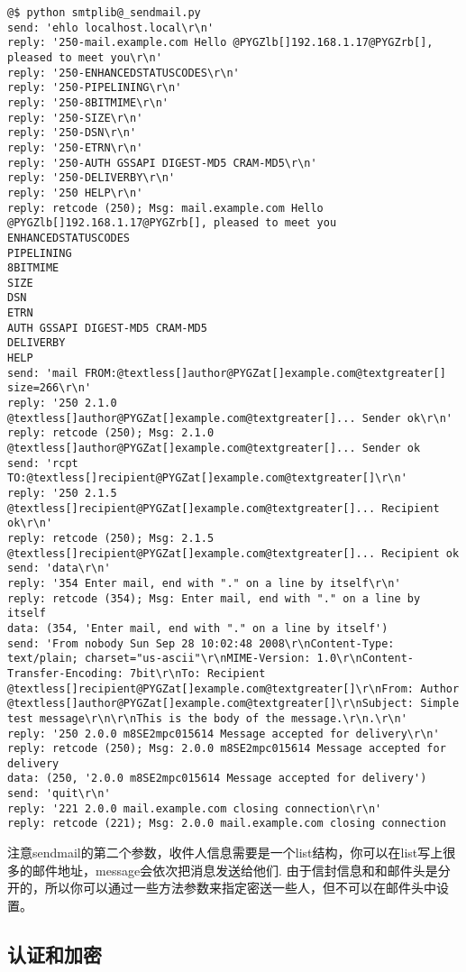 \documentclass[letterpaper,10pt,english]{manual}
\begin{document}
\begin{Verbatim}[commandchars=@\[\]]
@$ python smtplib@_sendmail.py
send: 'ehlo localhost.local\r\n'
reply: '250-mail.example.com Hello @PYGZlb[]192.168.1.17@PYGZrb[], pleased to meet you\r\n'
reply: '250-ENHANCEDSTATUSCODES\r\n'
reply: '250-PIPELINING\r\n'
reply: '250-8BITMIME\r\n'
reply: '250-SIZE\r\n'
reply: '250-DSN\r\n'
reply: '250-ETRN\r\n'
reply: '250-AUTH GSSAPI DIGEST-MD5 CRAM-MD5\r\n'
reply: '250-DELIVERBY\r\n'
reply: '250 HELP\r\n'
reply: retcode (250); Msg: mail.example.com Hello @PYGZlb[]192.168.1.17@PYGZrb[], pleased to meet you
ENHANCEDSTATUSCODES
PIPELINING
8BITMIME
SIZE
DSN
ETRN
AUTH GSSAPI DIGEST-MD5 CRAM-MD5
DELIVERBY
HELP
send: 'mail FROM:@textless[]author@PYGZat[]example.com@textgreater[] size=266\r\n'
reply: '250 2.1.0 @textless[]author@PYGZat[]example.com@textgreater[]... Sender ok\r\n'
reply: retcode (250); Msg: 2.1.0 @textless[]author@PYGZat[]example.com@textgreater[]... Sender ok
send: 'rcpt TO:@textless[]recipient@PYGZat[]example.com@textgreater[]\r\n'
reply: '250 2.1.5 @textless[]recipient@PYGZat[]example.com@textgreater[]... Recipient ok\r\n'
reply: retcode (250); Msg: 2.1.5 @textless[]recipient@PYGZat[]example.com@textgreater[]... Recipient ok
send: 'data\r\n'
reply: '354 Enter mail, end with "." on a line by itself\r\n'
reply: retcode (354); Msg: Enter mail, end with "." on a line by itself
data: (354, 'Enter mail, end with "." on a line by itself')
send: 'From nobody Sun Sep 28 10:02:48 2008\r\nContent-Type: text/plain; charset="us-ascii"\r\nMIME-Version: 1.0\r\nContent-Transfer-Encoding: 7bit\r\nTo: Recipient @textless[]recipient@PYGZat[]example.com@textgreater[]\r\nFrom: Author @textless[]author@PYGZat[]example.com@textgreater[]\r\nSubject: Simple test message\r\n\r\nThis is the body of the message.\r\n.\r\n'
reply: '250 2.0.0 m8SE2mpc015614 Message accepted for delivery\r\n'
reply: retcode (250); Msg: 2.0.0 m8SE2mpc015614 Message accepted for delivery
data: (250, '2.0.0 m8SE2mpc015614 Message accepted for delivery')
send: 'quit\r\n'
reply: '221 2.0.0 mail.example.com closing connection\r\n'
reply: retcode (221); Msg: 2.0.0 mail.example.com closing connection
\end{Verbatim}

注意sendmail的第二个参数，收件人信息需要是一个list结构，你可以在list写上很多的邮件地址，message会依次把消息发送给他们. 由于信封信息和和邮件头是分开的，所以你可以通过一些方法参数来指定密送一些人，但不可以在邮件头中设置。


\subsection{认证和加密}
\end{document}
